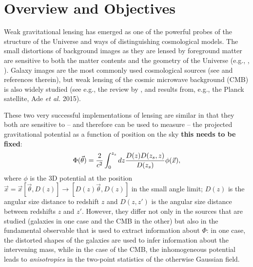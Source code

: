 \section{Overview and Objectives}
Weak gravitational lensing 
has emerged as one of the powerful probes of the
structure of the Universe and ways of distinguishing cosmological models. The 
small distortions of background images as they are lensed by foreground matter
are sensitive to both the matter contents and the geometry of the Universe
(e.g., \cite{blandford92}, \cite{hoekstra2008}).
Galaxy images are the most commonly used cosmological 
sources (see \cite{Kilbinger2015} and references therein),
but weak lensing of the cosmic microwave background (CMB) 
is also widely studied (see e.g., the review by \cite{lewis2006}, and results from, e.g., the Planck satellite, Ade {\it et
 al.} 2015). 
 
These two very successful implementations of lensing are similar in that they both are sensitive to -- and therefore can be used to measure -- the projected gravitational potential as a function of position on the sky {\bf this needs to be fixed}:
\begin{equation}
\Phi(\vec\theta)=\frac{2}{c^2}\int^{z_{s}}_{0}dz\frac{D(z)D(z_{s},z)}{D(z_{s})}\phi(\vec x),\eql{phi}
\end{equation}
where $\phi$ is the 3D potential at the position $\vec x=\vec x[\vec\theta,D(z)]\rightarrow [D(z)\vec\theta,D(z)]$ in the small angle limit; $D(z)$ is the angular size distance to redshift $z$ and $D(z,z')$ is the angular size distance between redshifts $z$ and $z'$. However, they
differ not only in the sources that are studied (galaxies in one case and the CMB in the other) but also in the fundamental observable that is used to extract information about $\Phi$: in one case, the distorted shapes of the galaxies are used to infer information about the intervening mass, while in the case of the CMB, the inhomogeneous potential leads to {\it anisotropies} in the two-point statistics of the otherwise Gaussian field. 

